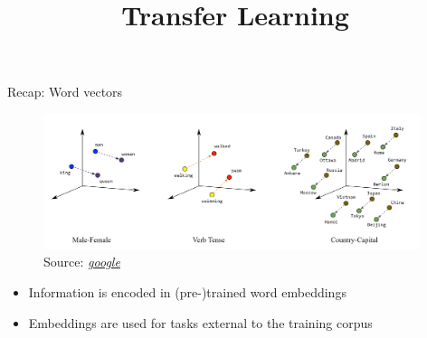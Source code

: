 



\newcommand{\titlefigure}{figure/elmo.jpg}
\newcommand{\learninggoals}{
\item Understand the contextualization of word embeddings
\item Get the intuition of feature-based Transfer Learning}

\title{Transfer Learning}
\date{}




\begin{vbframe}{Recap: Word vectors}

\vfill

	\begin{figure}
		\centering
		\includegraphics[width = 11cm]{figure/linear-relationships.png}\\ 
		\footnotesize{Source:} \href{https://developers.google.com/machine-learning/crash-course/embeddings/translating-to-a-lower-dimensional-space}{\footnotesize \it google}
	\end{figure}

	\begin{itemize}
		\item Information is encoded in (pre-)trained word embeddings
		\item Embeddings are used for tasks external to the training corpus
	\end{itemize}

\vfill

\end{vbframe}


